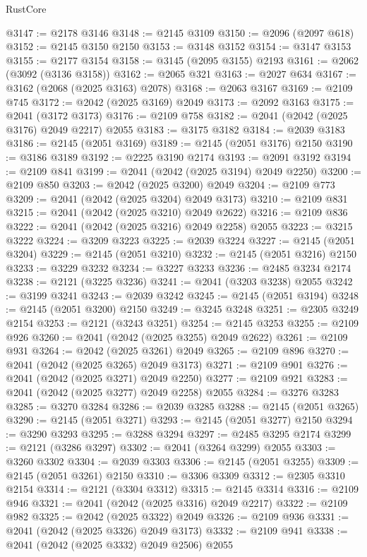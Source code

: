 \begin{lexlean}{RustCore}
\begin{coremodule}
@3147 := @2178 @3146
@3148 := @2145 @3109
@3150 := @2096 (@2097 @618)
@3152 := @2145 @3150 @2150
@3153 := @3148 @3152
@3154 := @3147 @3153
@3155 := @2177 @3154
@3158 := @3145 (@2095 @3155) @2193
@3161 := @2062 (@3092 (@3136 @3158))
@3162 := @2065 @321
@3163 := @2027 @634
@3167 := @3162 (@2068 (@2025 @3163) @2078)
@3168 := @2063 @3167
@3169 := @2109 @745
@3172 := @2042 (@2025 @3169) @2049
@3173 := @2092 @3163
@3175 := @2041 (@3172 @3173)
@3176 := @2109 @758
@3182 := @2041 (@2042 (@2025 @3176) @2049 @2217) @2055
@3183 := @3175 @3182
@3184 := @2039 @3183
@3186 := @2145 (@2051 @3169)
@3189 := @2145 (@2051 @3176) @2150
@3190 := @3186 @3189
@3192 := @2225 @3190 @2174
@3193 := @2091 @3192
@3194 := @2109 @841
@3199 := @2041 (@2042 (@2025 @3194) @2049 @2250)
@3200 := @2109 @850
@3203 := @2042 (@2025 @3200) @2049
@3204 := @2109 @773
@3209 := @2041 (@2042 (@2025 @3204) @2049 @3173)
@3210 := @2109 @831
@3215 := @2041 (@2042 (@2025 @3210) @2049 @2622)
@3216 := @2109 @836
@3222 := @2041 (@2042 (@2025 @3216) @2049 @2258) @2055
@3223 := @3215 @3222
@3224 := @3209 @3223
@3225 := @2039 @3224
@3227 := @2145 (@2051 @3204)
@3229 := @2145 (@2051 @3210)
@3232 := @2145 (@2051 @3216) @2150
@3233 := @3229 @3232
@3234 := @3227 @3233
@3236 := @2485 @3234 @2174
@3238 := @2121 (@3225 @3236)
@3241 := @2041 (@3203 @3238) @2055
@3242 := @3199 @3241
@3243 := @2039 @3242
@3245 := @2145 (@2051 @3194)
@3248 := @2145 (@2051 @3200) @2150
@3249 := @3245 @3248
@3251 := @2305 @3249 @2154
@3253 := @2121 (@3243 @3251)
@3254 := @2145 @3253
@3255 := @2109 @926
@3260 := @2041 (@2042 (@2025 @3255) @2049 @2622)
@3261 := @2109 @931
@3264 := @2042 (@2025 @3261) @2049
@3265 := @2109 @896
@3270 := @2041 (@2042 (@2025 @3265) @2049 @3173)
@3271 := @2109 @901
@3276 := @2041 (@2042 (@2025 @3271) @2049 @2250)
@3277 := @2109 @921
@3283 := @2041 (@2042 (@2025 @3277) @2049 @2258) @2055
@3284 := @3276 @3283
@3285 := @3270 @3284
@3286 := @2039 @3285
@3288 := @2145 (@2051 @3265)
@3290 := @2145 (@2051 @3271)
@3293 := @2145 (@2051 @3277) @2150
@3294 := @3290 @3293
@3295 := @3288 @3294
@3297 := @2485 @3295 @2174
@3299 := @2121 (@3286 @3297)
@3302 := @2041 (@3264 @3299) @2055
@3303 := @3260 @3302
@3304 := @2039 @3303
@3306 := @2145 (@2051 @3255)
@3309 := @2145 (@2051 @3261) @2150
@3310 := @3306 @3309
@3312 := @2305 @3310 @2154
@3314 := @2121 (@3304 @3312)
@3315 := @2145 @3314
@3316 := @2109 @946
@3321 := @2041 (@2042 (@2025 @3316) @2049 @2217)
@3322 := @2109 @982
@3325 := @2042 (@2025 @3322) @2049
@3326 := @2109 @936
@3331 := @2041 (@2042 (@2025 @3326) @2049 @3173)
@3332 := @2109 @941
@3338 := @2041 (@2042 (@2025 @3332) @2049 @2506) @2055

\end{coremodule}
\end{lexlean}
